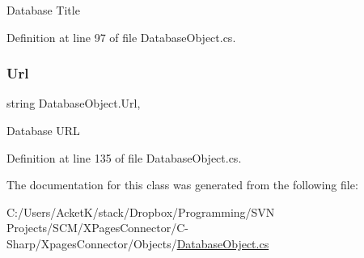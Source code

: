 Database Title 



Definition at line 97 of file Database\+Object.\+cs.

\mbox{\label{class_database_object_a12da011e3dc03d3a10ac86df10c84f48}} 
\subsubsection{\texorpdfstring{Url}{Url}}
{\footnotesize\ttfamily string Database\+Object.\+Url\hspace{0.3cm}{\ttfamily [get]}, {\ttfamily [set]}}



Database U\+RL 



Definition at line 135 of file Database\+Object.\+cs.



The documentation for this class was generated from the following file\+:\begin{DoxyCompactItemize}
\item 
C\+:/\+Users/\+Acket\+K/stack/\+Dropbox/\+Programming/\+S\+V\+N Projects/\+S\+C\+M/\+X\+Pages\+Connector/\+C-\/\+Sharp/\+Xpages\+Connector/\+Objects/\hyperlink{_database_object_8cs}{Database\+Object.\+cs}\end{DoxyCompactItemize}
